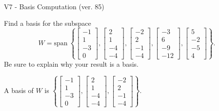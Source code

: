 \begin{exercise}
  \begin{exerciseTitle}V7 - Basis Computation (ver. 85)\end{exerciseTitle}
  \begin{exerciseStatement}
    Find a basis for the subspace 
\[W=\mathrm{span}\ \left\{\left[\begin{array}{r}
-1 \\
1 \\
-3 \\
0
\end{array}\right] , \left[\begin{array}{r}
2 \\
1 \\
-4 \\
-4
\end{array}\right] , \left[\begin{array}{r}
-2 \\
2 \\
-1 \\
-4
\end{array}\right] , \left[\begin{array}{r}
-3 \\
6 \\
-9 \\
-12
\end{array}\right] , \left[\begin{array}{r}
5 \\
-2 \\
-5 \\
4
\end{array}\right]\right\}.\]
 Be sure to explain why your result is a basis.


  \end{exerciseStatement}
  \begin{exerciseAnswer}
   A basis of \(W\) is  \(\left\{\left[\begin{array}{r}
-1 \\
1 \\
-3 \\
0
\end{array}\right] , \left[\begin{array}{r}
2 \\
1 \\
-4 \\
-4
\end{array}\right] , \left[\begin{array}{r}
-2 \\
2 \\
-1 \\
-4
\end{array}\right]\right\}\).
  


  \end{exerciseAnswer}
\end{exercise}